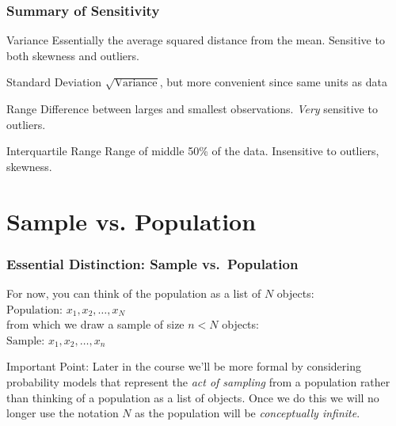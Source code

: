 \documentclass[handout]{beamer}
\begin{document}
\begin{frame}
\frametitle{Summary of Sensitivity}
	\begin{block}{Variance}
		Essentially the average squared distance from the mean. Sensitive to both skewness and 			outliers.
	\end{block}
	\begin{block}{Standard Deviation}
		$\sqrt{\mbox{Variance}}$, but more convenient since \alert{same units as data}
	\end{block}
	\begin{block}{Range}
		Difference between larges and smallest observations. \emph{Very} sensitive to outliers. 		
	\end{block}
	\begin{block}{Interquartile Range}
		Range of middle 50\% of the data. Insensitive to outliers, skewness. 
	\end{block}
\end{frame}

\section{Sample vs. Population}
\begin{frame}
\frametitle{Essential Distinction: Sample vs.\ Population}
	For now, you can think of the population as a list of $N$ objects:\\
		\alert{$\mbox{Population: }x_1, x_2, \hdots, x_N$}\\
	from which we draw a sample of size $n<N$ objects:\\
		\alert{$\mbox{Sample: } x_1, x_2, \hdots, x_n$}
	\vspace{3em}
	\begin{alertblock}{Important Point:}
		Later in the course we'll be more formal by considering \alert{probability models} that 				represent the \alert{\emph{act of sampling}} from a population rather than thinking of a 				population as a list of objects. Once we do this we will no longer use the notation $N$ as 			the population will be \alert{\emph{conceptually infinite}}.
	\end{alertblock}
\end{frame}
\end{document}
